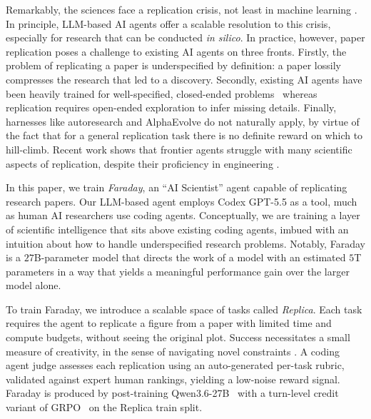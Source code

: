 \documentclass[garamond,a4paper]{inherent}
\newcommand{\faradayname}{Faraday\xspace}
\newcommand{\replicaname}{Replica\xspace}
\begin{document}
Remarkably, the sciences face a replication crisis, not least in machine learning \citep{kapoor2022leakage, semmelrock2025reproducibility}.
In principle, LLM-based AI agents offer a scalable resolution to this crisis, especially for research that can be conducted \textit{in silico}.
In practice, however, paper replication poses a challenge to existing AI agents on three fronts.
Firstly, the problem of replicating a paper is underspecified by definition: a paper lossily compresses the research that led to a discovery. 
Secondly, existing AI agents have been heavily trained for well-specified, closed-ended problems~\citep{shao2024deepseekmath, gunjal2025rubrics} whereas replication requires open-ended exploration to infer missing details.
Finally, harnesses like autoresearch \citep{autoresearch} and AlphaEvolve \citep{alphaevolve} do not naturally apply, by virtue of the fact that for a general replication task there is no definite reward on which to hill-climb.
Recent work shows that frontier agents struggle with many scientific aspects of replication, despite their proficiency in engineering \citep{kirgis2026aiagentsconductopenended}. 

In this paper, we train \textit{\faradayname}, an ``AI Scientist'' agent \citep{schmidhuber1991curiosity,muggleton2006artificial,sakanaaiscientist,louiskirschthesis} capable of replicating research papers.
Our LLM-based agent employs Codex GPT-5.5 as a tool, much as human AI researchers use coding agents.
Conceptually, we are training a layer of scientific intelligence that sits above existing coding agents, imbued with an intuition about how to handle underspecified research problems. 
Notably, Faraday is a $27$B-parameter model that directs the work of a model with an estimated $5$T parameters \citep{li2026incompressible} in a way that yields a meaningful performance gain over the larger model alone. 
\newpage

To train \faradayname, we introduce a scalable space of tasks called \textit{\replicaname}.
Each task requires the agent to replicate a figure from a paper with limited time and compute budgets, without seeing the original plot.
Success necessitates a small measure of creativity, in the sense of navigating novel constraints \citep{boden1995creativity,colton2012computational,epstein2026insidethebox}.
A coding agent judge assesses each replication using an auto-generated per-task rubric, validated against expert human rankings, yielding a low-noise reward signal.
\faradayname is produced by post-training Qwen3.6-27B~\citep{qwen2026qwen36} with a turn-level credit variant of GRPO~\citep{shao2024deepseekmath} on the \replicaname train split.
\end{document}
